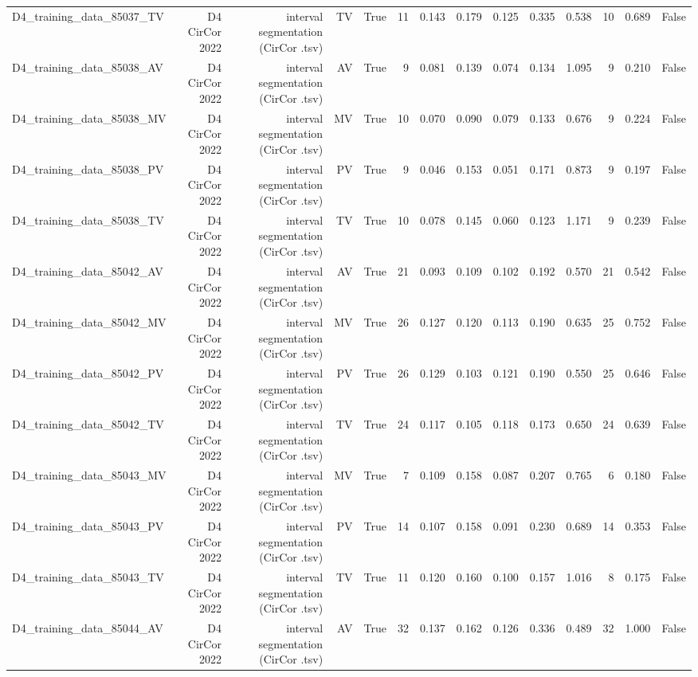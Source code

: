 \begin{table}[htbp]
\begin{tabular}{lrrrrrrrrrrrrr}
    D4\_training\_data\_85037\_TV & D4 CirCor 2022 & interval segmentation (CirCor .tsv) & TV & True & 11 & 0.143 & 0.179 & 0.125 & 0.335 & 0.538 & 10 & 0.689 & False \\
    D4\_training\_data\_85038\_AV & D4 CirCor 2022 & interval segmentation (CirCor .tsv) & AV & True & 9 & 0.081 & 0.139 & 0.074 & 0.134 & 1.095 & 9 & 0.210 & False \\
    D4\_training\_data\_85038\_MV & D4 CirCor 2022 & interval segmentation (CirCor .tsv) & MV & True & 10 & 0.070 & 0.090 & 0.079 & 0.133 & 0.676 & 9 & 0.224 & False \\
    D4\_training\_data\_85038\_PV & D4 CirCor 2022 & interval segmentation (CirCor .tsv) & PV & True & 9 & 0.046 & 0.153 & 0.051 & 0.171 & 0.873 & 9 & 0.197 & False \\
    D4\_training\_data\_85038\_TV & D4 CirCor 2022 & interval segmentation (CirCor .tsv) & TV & True & 10 & 0.078 & 0.145 & 0.060 & 0.123 & 1.171 & 9 & 0.239 & False \\
    D4\_training\_data\_85042\_AV & D4 CirCor 2022 & interval segmentation (CirCor .tsv) & AV & True & 21 & 0.093 & 0.109 & 0.102 & 0.192 & 0.570 & 21 & 0.542 & False \\
    D4\_training\_data\_85042\_MV & D4 CirCor 2022 & interval segmentation (CirCor .tsv) & MV & True & 26 & 0.127 & 0.120 & 0.113 & 0.190 & 0.635 & 25 & 0.752 & False \\
    D4\_training\_data\_85042\_PV & D4 CirCor 2022 & interval segmentation (CirCor .tsv) & PV & True & 26 & 0.129 & 0.103 & 0.121 & 0.190 & 0.550 & 25 & 0.646 & False \\
    D4\_training\_data\_85042\_TV & D4 CirCor 2022 & interval segmentation (CirCor .tsv) & TV & True & 24 & 0.117 & 0.105 & 0.118 & 0.173 & 0.650 & 24 & 0.639 & False \\
    D4\_training\_data\_85043\_MV & D4 CirCor 2022 & interval segmentation (CirCor .tsv) & MV & True & 7 & 0.109 & 0.158 & 0.087 & 0.207 & 0.765 & 6 & 0.180 & False \\
    D4\_training\_data\_85043\_PV & D4 CirCor 2022 & interval segmentation (CirCor .tsv) & PV & True & 14 & 0.107 & 0.158 & 0.091 & 0.230 & 0.689 & 14 & 0.353 & False \\
    D4\_training\_data\_85043\_TV & D4 CirCor 2022 & interval segmentation (CirCor .tsv) & TV & True & 11 & 0.120 & 0.160 & 0.100 & 0.157 & 1.016 & 8 & 0.175 & False \\
    D4\_training\_data\_85044\_AV & D4 CirCor 2022 & interval segmentation (CirCor .tsv) & AV & True & 32 & 0.137 & 0.162 & 0.126 & 0.336 & 0.489 & 32 & 1.000 & False \\

\end{tabular}
\end{table}
